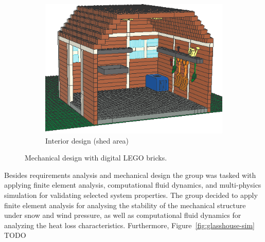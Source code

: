 \documentclass{PDS}
\begin{document}
\begin{figure}[htbp]
\begin{subfigure}[b]{0.3\textwidth}
        \includegraphics[width=\textwidth]{./figures/glasshouse_3.png}
        \caption{Interior design (shed area)}
        \label{fig:glasshouse_3}
    \end{subfigure}
    \caption{Mechanical design with digital LEGO bricks.}
    \label{fig:glasshouse}
\end{figure}

Besides requirements analysis and mechanical design the group was tasked with applying finite element analysis, computational fluid dynamics, and multi-physics simulation for validating selected system properties.
The group decided to apply finite element analysis for analysing the stability of the mechanical structure under snow and wind pressure, as well as computational fluid dynamics for analyzing the heat loss characteristics.
Furthermore, Figure~\ref{fig:glasshouse-sim} TODO
\end{document}
